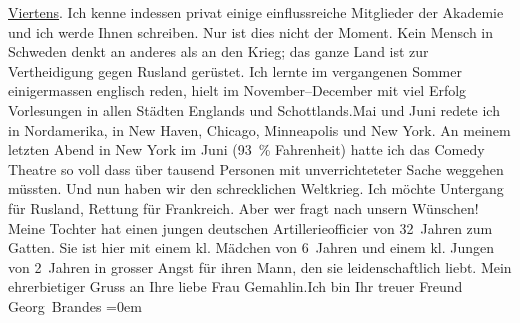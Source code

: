 \begin{ledgroupsized}[t]{13cm}
           \uline{Viertens}. Ich kenne indessen privat einige
                    einflussreiche Mitglieder der Akademie und ich werde Ihnen schreiben.\pend
           \pstart
           Nur ist dies nicht der Moment. Kein Mensch in Schweden denkt an anderes als an den Krieg; das ganze Land ist zur
                    Vertheidigung gegen Rusland gerüstet.\pend
           \pstart
           {\pb}Ich lernte im vergangenen
                    Sommer einigermassen englisch reden, hielt im
                        November–December mit viel Erfolg Vorlesungen in
                    allen Städten Englands und Schottlands.\hspace*{2em}Mai und Juni redete ich in Nordamerika, in New Haven, Chicago, Minneapolis und New York. An meinem
                    letzten Abend in New York im
                        Juni (93 {\%} Fahrenheit) hatte ich das
                        Comedy Theatre so voll dass über tausend
                    Personen mit unverrichteteter Sache weggehen müssten.\pend
           \pstart
           Und nun haben wir den schrecklichen Weltkrieg. Ich möchte Untergang für Rusland, Rettung für Frankreich. Aber wer fragt nach unsern Wünschen! Meine Tochter hat einen jungen
                    deutschen Artillerieofficier von 32 Jahren zum Gatten. Sie ist hier mit einem
                    kl. Mädchen von 6 Jahren
                    und einem kl. Jungen von
                    2 Jahren in grosser Angst für ihren Mann, den sie leidenschaftlich liebt.\pend
           \pstart
           Mein ehrerbietiger Gruss an Ihre liebe Frau Gemahlin.\hspace*{2em}Ich bin
                    Ihr treuer Freund{\\[\baselineskip]}\spacefill\mbox{Georg Brandes}\pend
           \leftskip=0em{}
         
         \endnumbering{}\end{ledgroupsized}  \newcommand{\dateiname}{L02195}\newcommand{\titel}{Georg Brandes an Arthur Schnitzler, 23. 8. 1914}\newcommand{\editorInnen}{Martin Anton Müller und Gerd-Hermann Susen}
      